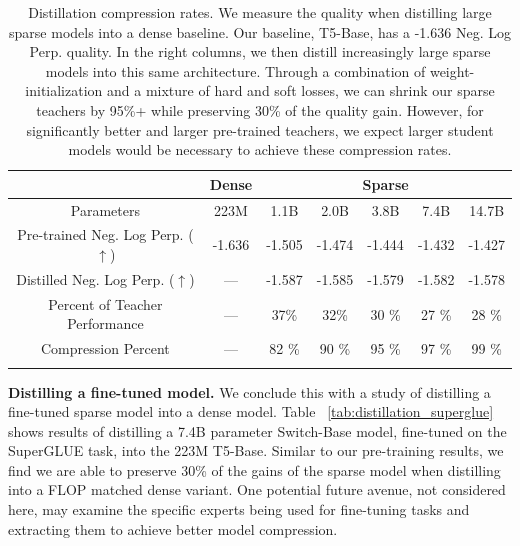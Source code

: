 \documentclass[twoside,11pt]{article}
\begin{document}
\begin{table}[h!]
\centering
\begin{tabular}{cc|ccccc}
    \toprule
    & {Dense} & \multicolumn{5}{c}{Sparse} \\
    \hline
     Parameters & 223M & 1.1B & 2.0B & 3.8B & 7.4B & 14.7B \\ 
     \hline
     Pre-trained Neg. Log Perp. ($\uparrow$) & -1.636 & -1.505 & -1.474 & -1.444 & -1.432 & -1.427 \\
     Distilled Neg. Log Perp. ($\uparrow$) & --- & -1.587 & -1.585 & -1.579 & -1.582 & -1.578 \\ 
     Percent of Teacher Performance & --- & 37\% & 32\% & 30 \% & 27 \% & 28 \% \\
     Compression Percent & --- & 82 \% & 90 \% & 95 \% & 97 \% & 99 \% \\
    \bottomrule
    \label{tab: top1_vs_moe}
\end{tabular}
\caption{Distillation compression rates. We measure the quality when distilling large sparse models into a dense baseline. Our baseline, T5-Base, has a -1.636 Neg. Log Perp. quality. In the right columns, we then distill increasingly large sparse models into this same architecture. Through a combination of weight-initialization and a mixture of hard and soft losses, we can shrink our sparse teachers by 95\%+ while preserving 30\% of the quality gain. 
However, for significantly better and larger pre-trained teachers, we expect larger student models would be necessary to achieve these compression rates.
}
\end{table}


\textbf{Distilling a fine-tuned model.}
We conclude this with a study of distilling a fine-tuned sparse model into a dense model.
Table ~\ref{tab:distillation_superglue} shows results of distilling a 7.4B parameter Switch-Base model, fine-tuned on the SuperGLUE task, into the 223M T5-Base.
Similar to our pre-training results, we find we are able to preserve 30\% of the gains of the sparse model when distilling into a FLOP matched dense variant.
One potential future avenue, not considered here, may examine the specific experts being used for fine-tuning tasks and extracting them to achieve better model compression.
\end{document}
